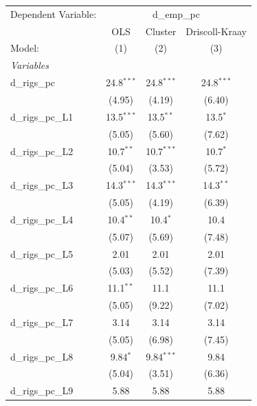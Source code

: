 
\begingroup
\centering
\begin{tabular}{lccc}
   \tabularnewline \midrule \midrule
   Dependent Variable: & \multicolumn{3}{c}{d\_emp\_pc}\\
                       & OLS            & Cluster        & Driscoll-Kraay \\   
   Model:              & (1)            & (2)            & (3)\\  
   \midrule
   \emph{Variables}\\
   d\_rigs\_pc         & 24.8$^{***}$   & 24.8$^{***}$   & 24.8$^{***}$\\   
                       & (4.95)         & (4.19)         & (6.40)\\   
   d\_rigs\_pc\_L1     & 13.5$^{***}$   & 13.5$^{**}$    & 13.5$^{*}$\\   
                       & (5.05)         & (5.60)         & (7.62)\\   
   d\_rigs\_pc\_L2     & 10.7$^{**}$    & 10.7$^{***}$   & 10.7$^{*}$\\   
                       & (5.04)         & (3.53)         & (5.72)\\   
   d\_rigs\_pc\_L3     & 14.3$^{***}$   & 14.3$^{***}$   & 14.3$^{**}$\\   
                       & (5.05)         & (4.19)         & (6.39)\\   
   d\_rigs\_pc\_L4     & 10.4$^{**}$    & 10.4$^{*}$     & 10.4\\   
                       & (5.07)         & (5.69)         & (7.48)\\   
   d\_rigs\_pc\_L5     & 2.01           & 2.01           & 2.01\\   
                       & (5.03)         & (5.52)         & (7.39)\\   
   d\_rigs\_pc\_L6     & 11.1$^{**}$    & 11.1           & 11.1\\   
                       & (5.05)         & (9.22)         & (7.02)\\   
   d\_rigs\_pc\_L7     & 3.14           & 3.14           & 3.14\\   
                       & (5.05)         & (6.98)         & (7.45)\\   
   d\_rigs\_pc\_L8     & 9.84$^{*}$     & 9.84$^{***}$   & 9.84\\   
                       & (5.04)         & (3.51)         & (6.36)\\   
   d\_rigs\_pc\_L9     & 5.88           & 5.88           & 5.88\\   

\end{tabular}
